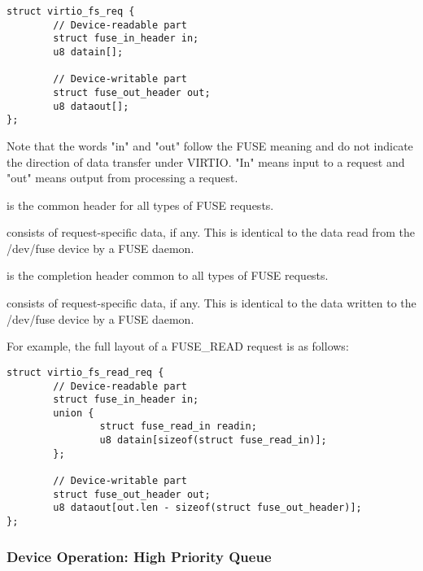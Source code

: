 \begin{lstlisting}
struct virtio_fs_req {
        // Device-readable part
        struct fuse_in_header in;
        u8 datain[];

        // Device-writable part
        struct fuse_out_header out;
        u8 dataout[];
};
\end{lstlisting}

Note that the words "in" and "out" follow the FUSE meaning and do not indicate
the direction of data transfer under VIRTIO.  "In" means input to a request and
"out" means output from processing a request.

 is the common header for all types of FUSE requests.

 consists of request-specific data, if any.  This is identical to
the data read from the /dev/fuse device by a FUSE daemon.

 is the completion header common to all types of FUSE requests.

 consists of request-specific data, if any.  This is identical
to the data written to the /dev/fuse device by a FUSE daemon.

For example, the full layout of a FUSE_READ request is as follows:

\begin{lstlisting}
struct virtio_fs_read_req {
        // Device-readable part
        struct fuse_in_header in;
        union {
                struct fuse_read_in readin;
                u8 datain[sizeof(struct fuse_read_in)];
        };

        // Device-writable part
        struct fuse_out_header out;
        u8 dataout[out.len - sizeof(struct fuse_out_header)];
};
\end{lstlisting}



\subsubsection{Device Operation: High Priority Queue}\label{sec:Device Types / File System Device / Device Operation / Device Operation: High Priority Queue}


